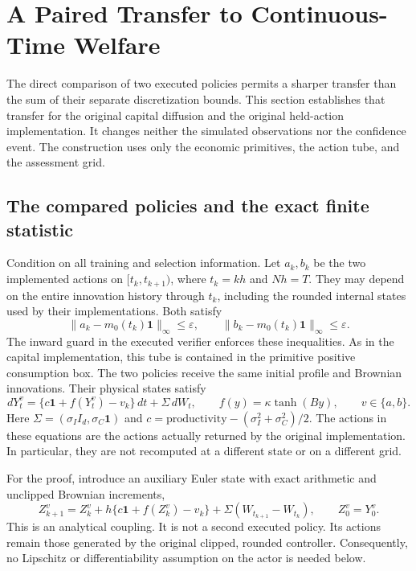 \section{A Paired Transfer to Continuous-Time Welfare}
\label{sec:r15pairedtransfer}
\label{app:r15pairedtransfer}

The direct comparison of two executed policies permits a sharper transfer
than the sum of their separate discretization bounds. This section establishes
that transfer for the original capital diffusion and the original held-action
implementation. It changes neither the simulated observations nor the
confidence event. The construction uses only the economic primitives, the
action tube, and the assessment grid.

\subsection{The compared policies and the exact finite statistic}

Condition on all training and selection information. Let $a_k,b_k$ be the two
implemented actions on $[t_k,t_{k+1})$, where $t_k=kh$ and $Nh=T$. They may
depend on the entire innovation history through $t_k$, including the rounded
internal states used by their implementations. Both satisfy
\begin{equation}
 \|a_k-m_0(t_k)\bm1\|_\infty\leq\varepsilon,
 \qquad
 \|b_k-m_0(t_k)\bm1\|_\infty\leq\varepsilon.
 \label{eq:r15pairedtube}
\end{equation}
The inward guard in the executed verifier enforces these inequalities.
As in the capital implementation, this tube is contained in the primitive
positive consumption box.
The two policies receive the same initial profile and Brownian innovations.
Their physical states satisfy
\[
 dY_t^v=\{c\bm1+f(Y_t^v)-v_k\}\,dt+\Sigma\,dW_t,
 \qquad f(y)=\kappa\tanh(By),\qquad v\in\{a,b\}.
\]
Here $\Sigma=(\sigma_I I_d,\sigma_C\bm1)$ and
$c=\text{productivity}-(\sigma_I^2+\sigma_C^2)/2$.
The actions in these equations are the actions actually returned by the
original implementation. In particular, they are not recomputed at a
different state or on a different grid.

For the proof, introduce an auxiliary Euler state with exact arithmetic and
unclipped Brownian increments,
\begin{equation}
 Z_{k+1}^v=Z_k^v+h\{c\bm1+f(Z_k^v)-v_k\}
                 +\Sigma(W_{t_{k+1}}-W_{t_k}),
 \qquad Z_0^v=Y_0^v.
 \label{eq:r15pairedauxiliary}
\end{equation}
This is an analytical coupling. It is not a second executed policy. Its
actions remain those generated by the original clipped, rounded controller.
Consequently, no Lipschitz or differentiability assumption on the actor is
needed below.

